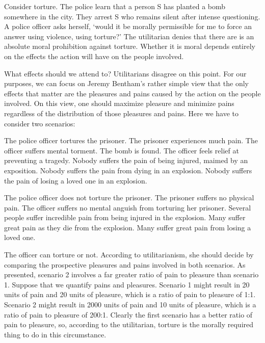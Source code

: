 \documentclass[]{article}
\begin{document}
Consider torture. The police learn that a person S has planted a bomb
somewhere in the city. They arrest S who remains silent after intense
questioning. A police officer asks herself, `would it be morally
permissible for me to force an answer using violence, using torture?'
The utilitarian denies that there are is an absolute moral prohibition
against torture. Whether it is moral depends entirely on the effects the
action will have on the people involved.

What effects should we attend to? Utilitarians disagree on this point.
For our purposes, we can focus on Jeremy Bentham's rather simple view
that the only effects that matter are the pleasures and pains caused by
the action on the people involved. On this view, one should maximize
pleasure and minimize pains regardless of the distribution of those
pleasures and pains. Here we have to consider two scenarios:

\begin{description}
\itemsep1pt\parskip0pt
\item[Scenario 1]
The police officer tortures the prisoner. The prisoner experiences much
pain. The officer suffers mental torment. The bomb is found. The officer
feels relief at preventing a tragedy. Nobody suffers the pain of being
injured, maimed by an exposition. Nobody suffers the pain from dying in
an explosion. Nobody suffers the pain of losing a loved one in an
explosion.
\item[Scenario 2]
The police officer does not torture the prisoner. The prisoner suffers
no physical pain. The officer suffers no mental anguish from torturing
her prisoner. Several people suffer incredible pain from being injured
in the explosion. Many suffer great pain as they die from the explosion.
Many suffer great pain from losing a loved one.
\end{description}

The officer can torture or not. According to utilitarianism, she should
decide by comparing the prospective pleasures and pains involved in both
scenarios. As presented, scenario 2 involves a far greater ratio of pain
to pleasure than scenario 1. Suppose that we quantify pains and
pleasures. Scenario 1 might result in 20 units of pain and 20 units of
pleasure, which is a ratio of pain to pleasure of 1:1. Scenario 2 might
result in 2000 units of pain and 10 units of pleasure, which is a ratio
of pain to pleasure of 200:1. Clearly the first scenario has a better
ratio of pain to pleasure, so, according to the utilitarian, torture is
the morally required thing to do in this circumstance.
\end{document}
